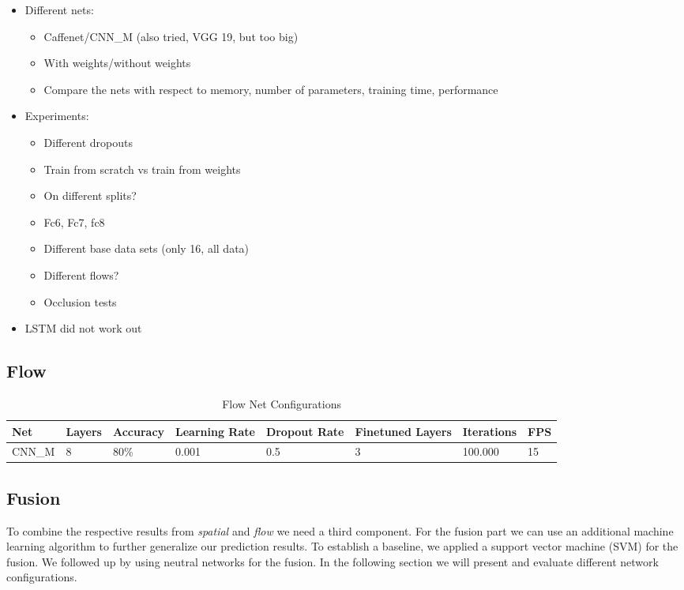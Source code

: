 \begin{itemize}
	\item
		Different nets:
		\begin{itemize}
			\item Caffenet/CNN\_M (also tried, VGG 19, but too big)
			\item With weights/without weights
			\item Compare the nets with respect to memory, number of parameters, training time, performance
		\end{itemize}
	\item
		Experiments:
		\begin{itemize}
			\item Different dropouts
			\item Train from scratch vs train from weights
			\item On different splits?
			\item Fc6, Fc7, fc8
			\item Different base data sets (only 16, all data)
			\item Different flows?
			\item Occlusion tests
		\end{itemize}
	\item
		LSTM did not work out
\end{itemize}


\subsection{Flow}
\label{subsec:flow}

\begin{table}[H]
\centering
\caption{Flow Net Configurations}
\label{table:flow_results}
\begin{tabularx}{\textwidth}{XXXXXXXX}
\toprule
Net 		& Layers	& Accuracy	& Learning Rate 	& Dropout Rate	& Finetuned Layers	& Iterations	& FPS\\ \midrule
CNN\_M		& 8			& 80\%		& 0.001			 	& 0.5			& 3					& 100.000		& 15\\
\bottomrule
\end{tabularx}
\end{table}

\subsection{Fusion}
\label{subsec:fusion}

To combine the respective results from \emph{spatial} and \emph{flow} we need a third component.
For the fusion part we can use an additional machine learning algorithm to further generalize our prediction results.
To establish a baseline, we applied a support vector machine (SVM) for the fusion.
We followed up by using neutral networks for the fusion.
In the following section we will present and evaluate different network configurations.



